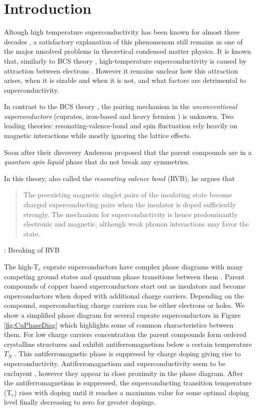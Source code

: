 \chapter{Introduction}
\label{chap:introduction}

Altough high temperature superconductivity has been known for almost three decades \cite{Bednorz1986}, a satisfactory explanation of this phenomenom still remains as one of the major unsolved problems in theoretical condensed matter physics. 
It is known that, similarly to BCS theory \cite{Bardeen1957}, high-temperature superconductivity is caused by attraction between electrons \cite{?}. 
However it remains unclear how this attraction arises, when it is sizable and when it is not, and what factors are detrimental to superconductivity.


In contrast to the BCS theory \cite{Bardeen1957}, the pairing mechanism in the \textit{unconventional superconductors} (cuprates, iron-based and heavy fermion \cite{Pfleiderer2009}) is unknown.
Two leading theories: resonating-valence-bond \cite{?} and spin fluctuation \cite{Scalapino2012} rely heavily on magnetic interactions while mostly ignoring the lattice effects.

Soon after their discovery Anderson proposed \cite{Anderson1987} that the parent compounds are in a \textit{quantum spin liquid} phase that do not break any symmetries. 

In this theory, also called the \textit{resonating valence bond} (RVB), he argues that
\begin{quote}
  The preexisting magnetic singlet pairs of the insulating state become charged superconducting pairs when the insulator is doped sufficiently strongly. 
The mechanism for superconductivity is hence predominantly electronic and magnetic, although weak phonon interactions may favor the state.
\end{quote} 

\cite{Chakravarty2008}: Breaking of RVB


The high-T$_c$ cuprate superconductors have complex phase diagrams with many competing ground states and quantum phase transitions between them \cite{Chakravarty2011}.
Parent compounds of copper based superconductors start out as insulators and become superconductors when doped with additional charge carriers.
Depending on the compound, superconducting charge carriers can be either electrons or holes.
We show a simplified phase diagram for several cuprate superconductors in Figure \ref{fig:CuPhaseDiag} which highlights some of common characteristics between them.
For low charge carriers concentration the parent compounds form ordered crystalline structures and exhibit antiferromagnetism below a certain temperature $T_N$ \cite{?}.
This antiferromagnetic phase is suppresed by charge doping giving rise to superconductivity.
Antiferromagnetism and superconductivity seem to be excluyent \cite{?}, however they appear in close proximity in the phase diagram.
After the antiferromagnetism is suppressed, the superconducting transition temperature (T$_c$) rises with doping until it reaches a maximum value for some optimal doping level finally decreasing to zero for greater dopings.

